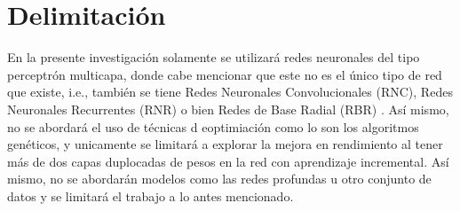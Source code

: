\chapter{Delimitación}
\label{sec:delimitation}
	
	
    En la presente investigación solamente se utilizará redes neuronales del tipo perceptr\'on multicapa,  donde 
    cabe mencionar que este no es el único tipo de red que existe, i.e., también se tiene Redes Neuronales Convolucionales (RNC), Redes Neuronales Recurrentes (RNR) o bien Redes de Base Radial (RBR) \cite{royo2021}. Así mismo, no se abordará el uso de técnicas d eoptimiación como lo son los algoritmos genéticos, y unicamente se limitará a explorar la mejora en rendimiento al tener más de dos capas duplocadas de pesos en la red con aprendizaje incremental.  Así mismo, no se abordarán modelos como las redes profundas u otro conjunto de datos y se limitará el trabajo a lo antes mencionado.



